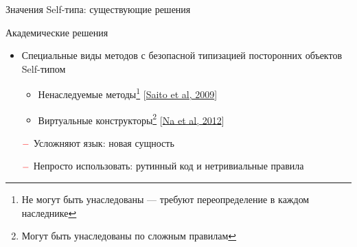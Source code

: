 \documentclass[usenames, dvipsnames]{beamer}
\begin{document}
    \begin{frame}[fragile]{Значения Self-типа: существующие решения}

        \begin{block}{Академические решения}
            \begin{itemize}
                \item Специальные виды методов с безопасной типизацией посторонних объектов Self-типом
                \begin{itemize}
                    \item Ненаследуемые методы\footnote{Не могут быть унаследованы --- требуют переопределение в каждом наследнике} [\href{http://www.fos.kuis.kyoto-u.ac.jp/~igarashi/papers/pdf/thistype-SAC09.pdf}{Saito et al, 2009}]
                    \item Виртуальные конструкторы\footnote{Могут быть унаследованы по сложным правилам} [\href{https://www.researchgate.net/profile/Sukyoung-Ryu/publication/254004584_Exact_type_parameterization_and_ThisType_support/links/54b90ed10cf269d8cbf72d01/Exact-type-parameterization-and-ThisType-support.pdf}{Na et al, 2012}]
                \end{itemize}
                \item[$\color{red} -$] Усложняют язык: новая сущность
                \item[$\color{red} -$] Непросто использовать: рутинный код и нетривиальные правила
            \end{itemize}
        \end{block}


\end{frame}
\end{document}
